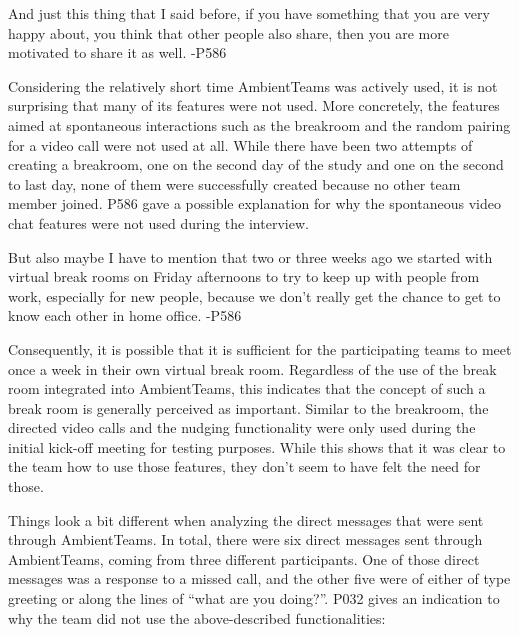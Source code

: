 \begin{displayquote}
    And just this thing that I said before, if you have something that you are very happy about, you think that other people also share, then you are more motivated to share it as well. -P586
\end{displayquote}


Considering the relatively short time AmbientTeams was actively used, it is not surprising that many of its features were not used. More concretely, the features aimed at spontaneous interactions such as the breakroom and the random pairing for a video call were not used at all. While there have been two attempts of creating a breakroom, one on the second day of the study and one on the second to last day, none of them were successfully created because no other team member joined. P586 gave a possible explanation for why the spontaneous video chat features were not used during the interview.

\begin{displayquote}
    But also maybe I have to mention that two or three weeks ago we started with virtual break rooms on Friday afternoons to try to keep up with people from work, especially for new people, because we don't really get the chance to get to know each other in home office. -P586
\end{displayquote}

Consequently, it is possible that it is sufficient for the participating teams to meet once a week in their own virtual break room. Regardless of the use of the break room integrated into AmbientTeams, this indicates that the concept of such a break room is generally perceived as important. Similar to the breakroom, the directed video calls and the nudging functionality were only used during the initial kick-off meeting for testing purposes. While this shows that it was clear to the team how to use those features, they don't seem to have felt the need for those.

Things look a bit different when analyzing the direct messages that were sent through AmbientTeams. In total, there were six direct messages sent through AmbientTeams, coming from three different participants. One of those direct messages was a response to a missed call, and the other five were of either of type greeting or along the lines of \enquote{what are you doing?}. P032 gives an indication to why the team did not use the above-described functionalities:

